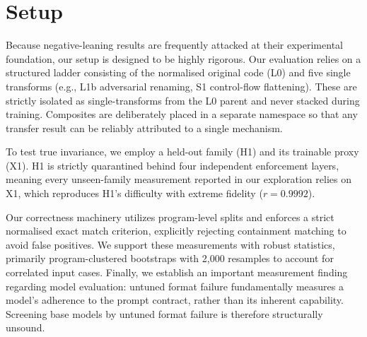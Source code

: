 \section{Setup}

Because negative-leaning results are frequently attacked at their experimental foundation, our setup is designed to be highly rigorous. Our evaluation relies on a structured ladder consisting of the normalised original code (L0) and five single transforms (e.g., L1b adversarial renaming, S1 control-flow flattening). These are strictly isolated as single-transforms from the L0 parent and never stacked during training. Composites are deliberately placed in a separate namespace so that any transfer result can be reliably attributed to a single mechanism.

To test true invariance, we employ a held-out family (H1) and its trainable proxy (X1). H1 is strictly quarantined behind four independent enforcement layers, meaning every unseen-family measurement reported in our exploration relies on X1, which reproduces H1's difficulty with extreme fidelity ($r = 0.9992$). 

Our correctness machinery utilizes program-level splits and enforces a strict normalised exact match criterion, explicitly rejecting containment matching to avoid false positives. We support these measurements with robust statistics, primarily program-clustered bootstraps with 2,000 resamples to account for correlated input cases. Finally, we establish an important measurement finding regarding model evaluation: untuned format failure fundamentally measures a model's adherence to the prompt contract, rather than its inherent capability. Screening base models by untuned format failure is therefore structurally unsound.
